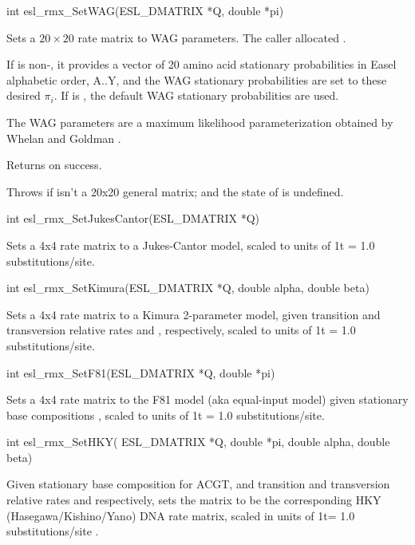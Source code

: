 \begin{sreapi}
\hypertarget{func:esl_rmx_SetWAG()}
{\item[int esl\_rmx\_SetWAG(ESL\_DMATRIX *Q, double *pi)]}

Sets a $20 \times 20$ rate matrix  to WAG parameters.
The caller allocated .

If  is non-, it provides a vector of 20 amino
acid stationary probabilities in Easel alphabetic order,
A..Y, and the WAG stationary probabilities are set to
these desired $\pi_i$. If  is , the default
WAG stationary probabilities are used.

The WAG parameters are a maximum likelihood
parameterization obtained by Whelan and Goldman
\citep{WhelanGoldman01}.

Returns  on success.

Throws  if  isn't a 20x20 general matrix; and
the state of  is undefined.


\hypertarget{func:esl_rmx_SetJukesCantor()}
{\item[int esl\_rmx\_SetJukesCantor(ESL\_DMATRIX *Q)]}

Sets a 4x4 rate matrix to a Jukes-Cantor model,
scaled to units of 1t = 1.0 substitutions/site.



\hypertarget{func:esl_rmx_SetKimura()}
{\item[int esl\_rmx\_SetKimura(ESL\_DMATRIX *Q, double alpha, double beta)]}

Sets a 4x4 rate matrix to a Kimura 2-parameter
model, given transition and transversion 
relative rates  and , respectively,
scaled to units of 1t = 1.0 substitutions/site.



\hypertarget{func:esl_rmx_SetF81()}
{\item[int esl\_rmx\_SetF81(ESL\_DMATRIX *Q, double *pi)]}

Sets a 4x4 rate matrix to the F81 model (aka
equal-input model) given stationary base 
compositions , 
scaled to units of 1t = 1.0 substitutions/site.


\hypertarget{func:esl_rmx_SetHKY()}
{\item[int esl\_rmx\_SetHKY( ESL\_DMATRIX *Q, double *pi, double alpha, double beta)]}

Given stationary base composition  for ACGT, and
transition and transversion relative rates  and
 respectively, sets the matrix  to be the
corresponding HKY (Hasegawa/Kishino/Yano) DNA rate
matrix, scaled in units of 1t= 1.0 substitutions/site
\citep{Hasegawa85}.        


\end{sreapi}
